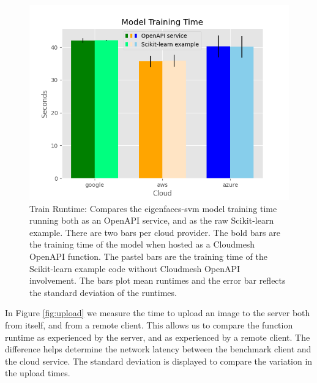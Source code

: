 \begin{figure}[htb]
\centering
\includegraphics[width=\columnwidth]{../images/sample_graph_2.png}
\caption{Train Runtime: Compares the eigenfaces-svm model training time
running both as an OpenAPI service, and as the raw Scikit-learn example.
There are two bars per cloud provider. The bold bars are the training
time of the model when hosted as a Cloudmesh OpenAPI function. The
pastel bars are the training time of the Scikit-learn example code
without Cloudmesh OpenAPI involvement. The bars plot mean runtimes and
the error bar reflects the standard deviation of the runtimes.}
\label{fig:4}
\end{figure}

In Figure \ref{fig:upload} we measure the time to upload an image to the server both
from itself, and from a remote client. This allows us to compare the
function runtime as experienced by the server, and as experienced by a
remote client. The difference helps determine the network latency
between the benchmark client and the cloud service. The standard
deviation is displayed to compare the variation in the upload times.

